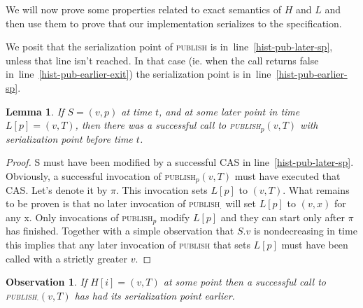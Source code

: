 \documentclass{thesis}
\newtheorem{lemma}{Lemma}
\newtheorem{observation}{Observation}
\newcommand{\fn}[1]{\textsc{#1}}
\begin{document}
We will now prove some properties related to exact semantics of $H$ and $L$ and then use them to prove that our implementation serializes to the specification.



We posit that the serialization point of \fn{publish} is in~line~\ref{hist-pub-later-sp}, unless that line isn't reached. In that case (ie. when the call returns false in~line~\ref{hist-pub-earlier-exit})
the serialization point is in~line~\ref{hist-pub-earlier-sp}.


\begin{lemma}\label{hist-cv-latest}
If $S = (v, p)$ at time $t$, and at some later point in time $L[p] = (v, T)$, then there was a successful call to \fn{publish$_p$}$(v, T)$ with serialization point before time $t$.
\end{lemma}
\begin{proof}
S must have been modified by a successful CAS in line~\ref{hist-pub-later-sp}. Obviously, a successful invocation of \fn{publish$_p$}$(v, T)$ must have executed that CAS. Let's denote it by $\pi$.
This invocation sets $L[p]$ to $(v, T)$. What remains to be proven is that no later invocation of \fn{publish$_\cdot$} will set $L[p]$ to $(v, x)$ for any x.
Only invocations of \fn{publish$_p$} modify $L[p]$ and they can start only after $\pi$ has finished. Together with a simple observation that $S.v$ is nondecreasing in time this implies
that any later invocation of \fn{publish} that sets $L[p]$ must have been called with a strictly greater $v$.
\end{proof}

\begin{observation}
\label{obs-hist-is-correct}
If $H[i] = (v, T)$ at some point then a successful call to \fn{publish$_\cdot$}$(v, T)$ has had its serialization point earlier.
\end{observation}
\end{document}
